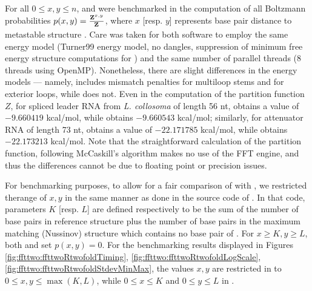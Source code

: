 For all $0 \leq x,y \leq n$, \rnatwofold and \ffttwo were
benchmarked in the computation of all Boltzmann probabilities
$p(x,y)= \frac{{\bf Z}^{x,y}_{}}{{\bf Z}^{}_{}}$, where $x$ [resp. $y$] represents base pair
distance to metastable structure . Care was taken for
both software to employ the same energy model (Turner99 energy model,
no dangles, suppression of minimum free energy structure computations
for \rnatwofold) and the same number of parallel threads (8 threads
using OpenMP). Nonetheless, there are slight differences in the energy
models --- namely, \rnatwofold includes
mismatch penalties for multiloop stems and for exterior loops, while
\ffttwo does not. Even in the computation of the partition function
$Z$, for spliced leader RNA from {\em L. collosoma} of length 56 nt,
\rnatwofold {} obtains a value of
$-9.660419$ kcal/mol, while \ffttwo obtains
$-9.660543$ kcal/mol; similarly, for attenuator RNA of length 73 nt,
\rnatwofold {} obtains a value of
$-22.171785$ kcal/mol, while \ffttwo obtains
$-22.173213$ kcal/mol.
Note that the straightforward calculation of the partition function, following McCaskill's algorithm \cite{mccaskill} makes no use of the FFT engine, and thus the differences cannot be due to floating point or precision issues.

For benchmarking purposes,
to allow for a fair comparison of \ffttwo
with \rnatwofold, we restricted therange of $x,y$ in the same manner as done in the source code of \rnatwofold.
In that code, parameters $K$ [resp. $L$] are defined respectively to be the
sum of the number of base pairs in reference structure  plus the number of base pairs in
the maximum matching (Nussinov) structure which contains
no base pair of .
For $x \geq K, y \geq L$, both \rnatwofold and \ffttwo
set $p(x,y)=0$.  For the benchmarking results displayed in
Figures \ref{fig:ffttwo:ffttwoRtwofoldTiming},
\ref{fig:ffttwo:ffttwoRtwofoldLogScale},
\ref{fig:ffttwo:ffttwoRtwofoldStdevMinMax},
the values $x,y$ are restricted in
\ffttwo to $0 \leq x,y \leq \max(K,L)$, while $0 \leq x \leq K$
and $0 \leq y \leq L$ in \rnatwofold.


